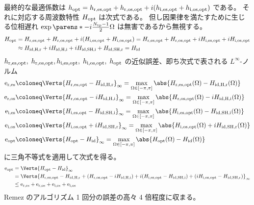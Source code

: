             最終的な最適係数は $h_{\text{opt}} = h_{\text{r,es,opt}} + h_{\text{r,os,opt}} + i(h_{\text{i,es,opt}} + h_{\text{i,os,opt}})$ である。
            それに対応する周波数特性 $H_{\text{opt}}$ は次式である。
            但し因果律を満たすために生じる位相遅れ $\exp\parens*{-i\frac{\Ntp-1}{2}\Omega}$ は無害であるから無視する。
            \begin{align*}
                H_{\text{opt}} &= H_{\text{r,es,opt}} + H_{\text{r,os,opt}} + i(H_{\text{i,es,opt}} + H_{\text{i,os,opt}}) = H_{\text{r,es,opt}} + H_{\text{r,os,opt}} + iH_{\text{i,es,opt}} + iH_{\text{i,os,opt}} \\
                &\approx H_{\text{id,H,r}} + iH_{\text{id,H,i}} + iH_{\text{id,SH,i}} + H_{\text{id,SH,r}} = H_{\text{id}}
            \end{align*}
            $h_{\text{r,es,opt}},\;h_{\text{r,os,opt}},h_{\text{i,es,opt}},\;h_{\text{i,os,opt}},\;h_{\text{opt}}$ の近似誤差、即ち次式で表される $L^\infty$-ノルム
            \begin{align*}
                \erEs &\coloneq \Verts{\HrEsOpt - \HidHr}_\infty = \max_{\Omega\in[-\pi,\pi]}\abs{\HrEsOpt(\Omega) - \HidHr(\Omega)} \\
                \erOs &\coloneq \Verts{\HrOsOpt - i\HidHi}_\infty = \max_{\Omega\in[-\pi,\pi]}\abs{\HrOsOpt(\Omega) - i\HidHi(\Omega)} \\
                \eiEs &\coloneq \Verts{\HiEsOpt - \HidSHi}_\infty = \max_{\Omega\in[-\pi,\pi]}\abs{\HiEsOpt(\Omega) - \HidSHi(\Omega)} \\
                \eiOs &\coloneq \Verts{\HiOsOpt + i\HidSHr}_\infty = \max_{\Omega\in[-\pi,\pi]}\abs{\HiOsOpt(\Omega) + i\HidSHr(\Omega)} \\
                \eOpt &\coloneq \Verts{\Hopt - \Hid}_\infty = \max_{\Omega\in[-\pi,\pi]}\abs{\Hopt(\Omega ) -\Hid(\Omega)}
            \end{align*}
            に三角不等式を適用して次式を得る。
            \begin{align*}
                \eOpt &= \Verts{\Hopt - \Hid}_\infty \\
                &= \Verts{\HrEsOpt - \HidHr + (\HrOsOpt - i\HidHi) + i(\HiEsOpt - \HidSHi) + (i\HiOsOpt - \HidSHr)}_\infty \\
                &\leq \erEs + \erOs + \eiEs + \eiOs
            \end{align*}
            Remez のアルゴリズム 1 回分の誤差の高々 4 倍程度に収まる。

